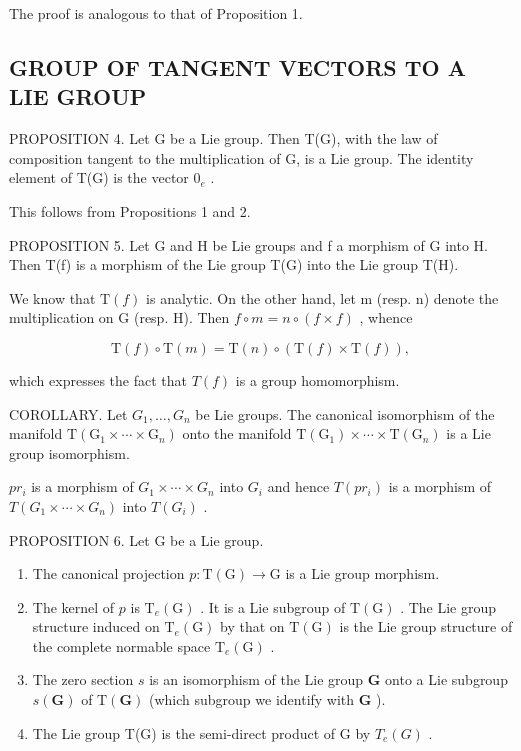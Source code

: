 The proof is analogous to that of Proposition 1.

\subsection{GROUP OF TANGENT VECTORS TO A LIE GROUP}

PROPOSITION 4. Let G be a Lie group. Then T(G), with the law of composition tangent to the multiplication of G, is a Lie group. The identity element of T(G) is the vector \(0_{e}\) .

This follows from Propositions 1 and 2.

PROPOSITION 5. Let G and H be Lie groups and f a morphism of G into H. Then T(f) is a morphism of the Lie group T(G) into the Lie group T(H).

We know that \(\mathrm{T}(f)\) is analytic. On the other hand, let m (resp. n) denote the multiplication on G (resp. H). Then \(f \circ m = n \circ (f \times f)\) , whence

\[
\mathrm{T} (f) \circ \mathrm{T} (m) = \mathrm{T} (n) \circ (\mathrm{T} (f) \times \mathrm{T} (f)),
\]

which expresses the fact that \(T(f)\) is a group homomorphism.

COROLLARY. Let \(G_{1},\ldots,G_{n}\) be Lie groups. The canonical isomorphism of the manifold \(\mathrm{T}(\mathrm{G}_{1}\times\cdots\times\mathrm{G}_{n})\) onto the manifold \(\mathrm{T}(\mathrm{G}_{1})\times\cdots\times\mathrm{T}(\mathrm{G}_{n})\) is a Lie group isomorphism.

\(pr_{i}\) is a morphism of \(G_{1} \times \cdots \times G_{n}\) into \(G_{i}\) and hence \(T(pr_{i})\) is a morphism of \(T(G_{1} \times \cdots \times G_{n})\) into \(T(G_{i})\) .

PROPOSITION 6. Let G be a Lie group.

\begin{enumerate}
\def\labelenumi{(\roman{enumi})}
\item
  The canonical projection \(p: \mathrm{T}(\mathrm{G}) \to \mathrm{G}\) is a Lie group morphism.
\item
  The kernel of \(p\) is \(\mathrm{T}_e(\mathrm{G})\) . It is a Lie subgroup of \(\mathrm{T}(\mathrm{G})\) . The Lie group structure induced on \(\mathrm{T}_e(\mathrm{G})\) by that on \(\mathrm{T}(\mathrm{G})\) is the Lie group structure of the complete normable space \(\mathrm{T}_e(\mathrm{G})\) .
\item
  The zero section \(s\) is an isomorphism of the Lie group \(\mathbf{G}\) onto a Lie subgroup \(s(\mathbf{G})\) of \(\mathrm{T}(\mathbf{G})\) (which subgroup we identify with \(\mathbf{G}\) ).
\item
  The Lie group T(G) is the semi-direct product of G by \(T_{e}(G)\) .
\end{enumerate}

